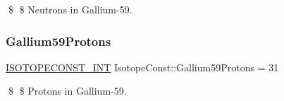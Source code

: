 \$ \$ Neutrons in Gallium-\/59. \mbox{\label{group___isotope_const-_gallium-_ga59_ga3851c542e65a4df9c8d15432a16f2ee9}} 
\subsubsection{\texorpdfstring{Gallium59\+Protons}{Gallium59Protons}}
{\footnotesize\ttfamily \mbox{\hyperlink{group___isotope_const-_macros_ga5f18360b3e99483a35c32d789e62621c}{I\+S\+O\+T\+O\+P\+E\+C\+O\+N\+S\+T\+\_\+\+I\+NT}} Isotope\+Const\+::\+Gallium59\+Protons = 31}

\$ \$ Protons in Gallium-\/59. 